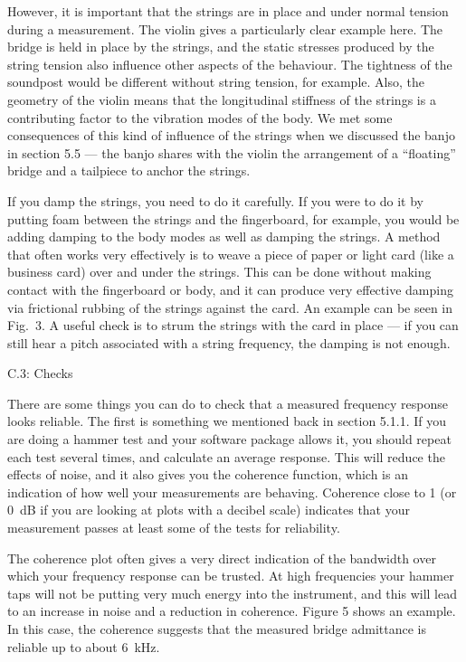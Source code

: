 
  However, it is important that the strings are in place and under normal 
  tension during a measurement. The violin gives a particularly clear example 
  here. The bridge is held in place by the strings, and the static stresses 
  produced by the string tension also influence other aspects of the behaviour. 
  The tightness of the soundpost would be different without string tension, for 
  example. Also, the geometry of the violin means that the longitudinal 
  stiffness of the strings is a contributing factor to the vibration modes of 
  the body. We met some consequences of this kind of influence of the strings 
  when we discussed the banjo in section 5.5 — the banjo shares with the violin 
  the arrangement of a “floating” bridge and a tailpiece to anchor the strings. 

  If you damp the strings, you need to do it carefully. If you were to do it by 
  putting foam between the strings and the fingerboard, for example, you would 
  be adding damping to the body modes as well as damping the strings. A method 
  that often works very effectively is to weave a piece of paper or light card 
  (like a business card) over and under the strings. This can be done without 
  making contact with the fingerboard or body, and it can produce very 
  effective damping via frictional rubbing of the strings against the card. An 
  example can be seen in Fig.\ 3. A useful check is to strum the strings with 
  the card in place — if you can still hear a pitch associated with a string 
  frequency, the damping is not enough. 

  C.3: Checks 

  There are some things you can do to check that a measured frequency response 
  looks reliable. The first is something we mentioned back in section 5.1.1. If 
  you are doing a hammer test and your software package allows it, you should 
  repeat each test several times, and calculate an average response. This will 
  reduce the effects of noise, and it also gives you the coherence function, 
  which is an indication of how well your measurements are behaving. Coherence 
  close to 1 (or 0~dB if you are looking at plots with a decibel scale) 
  indicates that your measurement passes at least some of the tests for 
  reliability. 

  The coherence plot often gives a very direct indication of the bandwidth over 
  which your frequency response can be trusted. At high frequencies your hammer 
  taps will not be putting very much energy into the instrument, and this will 
  lead to an increase in noise and a reduction in coherence. Figure 5 shows an 
  example. In this case, the coherence suggests that the measured bridge 
  admittance is reliable up to about 6~kHz. 

